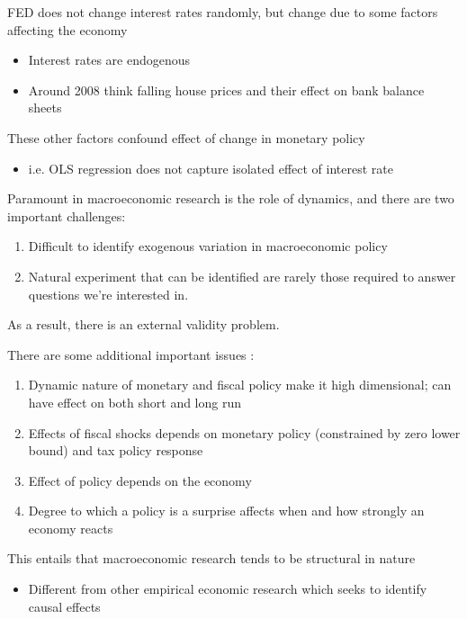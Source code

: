 \documentclass{beamer}
\begin{document}
\begin{frame}
  FED does not change interest rates randomly, but change due to some factors affecting the economy
  \begin{itemize}
    \item Interest rates are endogenous    
    \item Around 2008 think falling house prices and their effect on bank balance sheets
  \end{itemize}
    \medskip
  These other factors confound effect of change in monetary policy
  \begin{itemize}
    \item i.e. OLS regression does not capture isolated effect of interest rate
  \end{itemize}
\end{frame}

\begin{frame}
  Paramount in macroeconomic research is the role of dynamics, and there are two important challenges:
  \begin{enumerate}
    \item Difficult to identify exogenous variation in macroeconomic policy
    \item Natural experiment that can be identified are rarely those required to answer questions we're interested in. 
  \end{enumerate}
  \medskip
  As a result, there is an external validity problem.
\end{frame}


\begin{frame}
 There are some additional important issues : 
 \begin{enumerate}
   \item Dynamic nature of monetary and fiscal policy make it high dimensional; can have effect on both short and long run
   \item Effects of fiscal shocks depends on monetary policy (constrained by zero lower bound) and tax policy response
   \item Effect of policy depends on the economy
   \item Degree to which a policy is a surprise affects when and how strongly an economy reacts  
 \end{enumerate}
 \medskip
 This entails that macroeconomic research tends to be structural in nature
 \begin{itemize}
   \item Different from other empirical economic research which seeks to identify causal effects
 \end{itemize} 
\end{frame}
\end{document}
